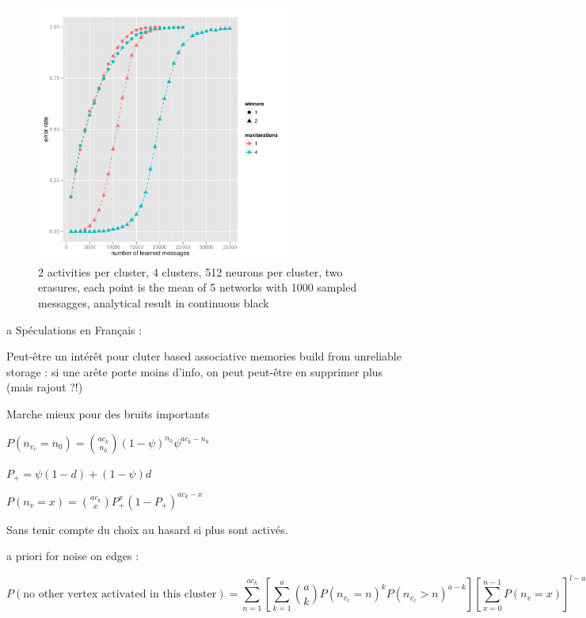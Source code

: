 \documentclass[english,11pt,twocolumn]{article}
\renewcommand{\ge}{\geqslant}
\theoremstyle{definition}
\begin{document}
	\begin{figure}
		\includegraphics[width=8.5cm]{comp_erreurs_a2l512c4er1}
		\caption{2 activities per cluster, 4 clusters, 512 neurons per cluster, two erasures, each point is the mean of 5 networks with 1000 sampled messagges, analytical result in continuous black}
	\end{figure}
		
	\newpage
	a
	\newpage
	Spéculations en Français :
	
	Peut-être un intérêt pour cluter based associative memories build from unreliable storage : si une arête porte moins d'info, on peut peut-être en supprimer plus (mais rajout ?!)
	

	Marche mieux pour des bruits importants
	
	$P(n_{v_c} = n_0) = {a c_k \choose n_0} (1-\psi)^{n_0} \psi ^ { a c_k - n_0 }$
	
	$P_+ = \psi (1 - d) + (1 - \psi) d$
	
	$P(n_v = x) = {a c_k \choose x} P_+^x (1-P_+)^{a c_k -x }$

	
	
	Sans tenir compte du choix au hasard si plus sont activés.
	
		a priori for noise on edges :
	
	\[P(\mbox{no other vertex activated in this cluster})= \sum_{n = 1}^{a c_k} \left [ \sum_{k = 1}^{a} { a \choose k }   P(n_{v_c} = n)^k P(n_{v_c} > n)^{a-k} \right ] \left [ \sum_{x = 0}^{n - 1} P(n_v = x) \right]^{l-a } \]	
	
\end{document}
